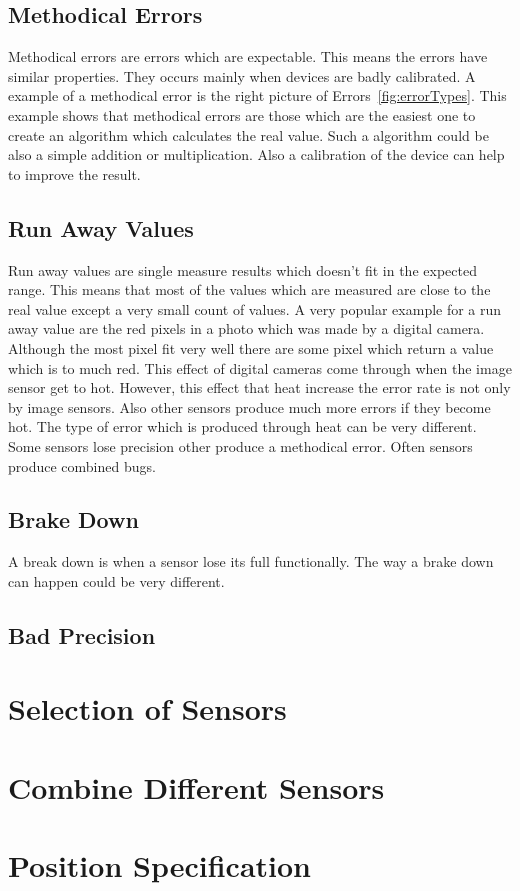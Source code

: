 \subsection{Methodical Errors}
Methodical errors are errors which are expectable.
This means the errors have similar properties.
They occurs mainly when devices are badly calibrated.
A example of a methodical error is the right picture of Errors~\ref{fig:errorTypes}.
This example shows that methodical errors are those which are the easiest one to create an algorithm which calculates the real value.
Such a algorithm could be also a simple addition or multiplication.
Also a calibration of the device can help to improve the result.


\subsection{Run Away Values}
Run away values are single measure results which doesn't fit in the expected range.
This means that most of the values which are measured are close to the real value except a very small count of values.
A very popular example for a run away value are the red pixels in a photo which was made by a digital camera.
Although the most pixel fit very well there are some pixel which return a value which is to much red.
This effect of digital cameras come through when the image sensor get to hot.
However, this effect that heat increase the error rate is not only by image sensors.
Also other sensors produce much more errors if they become hot.
The type of error which is produced through heat can be very different.
Some sensors lose precision other produce a methodical error.
Often sensors produce combined bugs.


\subsection{Brake Down}
A break down is when a sensor lose its full functionally.
The way a brake down can happen could be very different.



\subsection{Bad Precision}


\section{Selection of Sensors}


\section{Combine Different Sensors}


\section{Position Specification}
